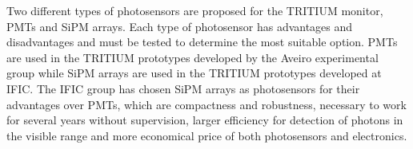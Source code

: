 Two different types of photosensors are proposed for the TRITIUM monitor, PMTs and SiPM arrays. Each type of photosensor has advantages and disadvantages and must be tested to determine the most suitable option. PMTs are used in the TRITIUM prototypes developed by the Aveiro experimental group while SiPM arrays are used in the TRITIUM prototypes developed at IFIC. The IFIC group has chosen SiPM arrays as photosensors for their advantages over PMTs, which are compactness and robustness, necessary to work for several years without supervision, larger efficiency for detection of photons in the visible range and more economical price of both photosensors and electronics.